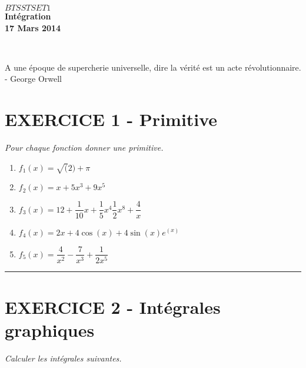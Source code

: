 \documentclass[11pt]{article}
\begin{document}
\begin{minipage}[t]{\textwidth}
  \raggedright
      {\bfseries $BTS STS ET 1$}\\[.35ex]
      \vspace*{-1cm}
      \raggedleft
          {\bfseries Intégration}\\[.35ex]
          {\bfseries 17 Mars 2014}\\[.35ex]
\end{minipage}\\[1em]

\begin{center}
  \textsf{A une époque de supercherie universelle, dire la vérité est un acte révolutionnaire. - George Orwell}
\end{center}


\setlength{\columnseprule}{1pt}

  \section*{EXERCICE 1 - Primitive}
  \textit{Pour chaque fonction donner une primitive.}

\begin{multicols}{2}


  \begin{enumerate}
  \item $f_{1}(x) = \sqrt(2) + \pi$
  \item $f_{2}(x) = x + 5x^3 + 9 x^5$
  \item $f_{3}(x) = 12 + \dfrac{1}{10}x + \dfrac{1}{5}x^{4} \dfrac{1}{2}x^{8} + \dfrac{4}{x} $
  \item $f_{4}(x) = 2x + 4\cos(x) + 4\sin(x) e^{(x)}$
  \item $f_{5}(x) = \dfrac{4}{x^2} - \dfrac{7}{x^3} + \dfrac{1}{2x^5}$
  \end{enumerate}

\end{multicols}

\rule{\textwidth}{1pt}

\section*{EXERCICE 2 -  Intégrales graphiques}
\textit{Calculer les intégrales suivantes.}

\begin{figure}[H]
  \centering
\end{figure}
\end{document}
